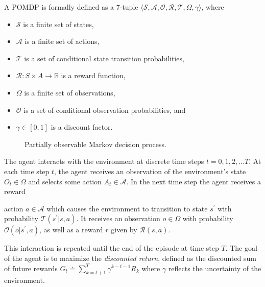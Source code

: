 A POMDP is formally defined as a 7-tuple \(\langle \mathcal{S}, \mathcal{A}, \mathcal{O}, \mathcal{R}, \mathcal{T}, \Omega, \gamma \rangle\), where

\begin{itemize}
    \item \(\mathcal{S}\) is a finite set of states,
    \item \(\mathcal{A}\) is a finite set of actions,
    \item \(\mathcal{T}\) is a set of conditional state transition probabilities,
    \item \(\mathcal{R} : S \times A \rightarrow \mathbb{R}\) is a reward function,
    \item \(\Omega\) is a finite set of observations,
    \item \(\mathcal{O}\) is a set of conditional observation probabilities, and
    \item \(\gamma \in [0, 1]\) is a discount factor.
\end{itemize}

\begin{figure}
    \centering
    
    \label{fig:pomdp}
    \caption{Partially observable Markov decision process.}
\end{figure}

The agent interacts with the environment at discrete time steps \(t = 0, 1, 2, \dots T\). At each time step \(t\), the agent receives an observation of the environment's state \(O_t \in \Omega\) and selects some action \(A_t \in \mathcal{A}\).
In the next time step the agent receives a reward

action \(a \in \mathcal{A}\) which causes the environment to transition to state \(s^\prime\) with probability \(\mathcal{T}(s^\prime | s, a)\).
It receives an observation \(o \in \Omega\) with probability \(\mathcal{O}(o | s^\prime, a)\), as well as a reward \(r\) given by \(\mathcal{R}(s, a)\).

This interaction is repeated until the end of the episode at time step \(T\).
The goal of the agent is to maximize the \textit{discounted return}, defined as the discounted sum of future rewards \(G_t \doteq \sum_{k=t+1}^T \gamma^{k-t-1} R_{k}\) where \(\gamma\) reflects the uncertainty of the environment.


